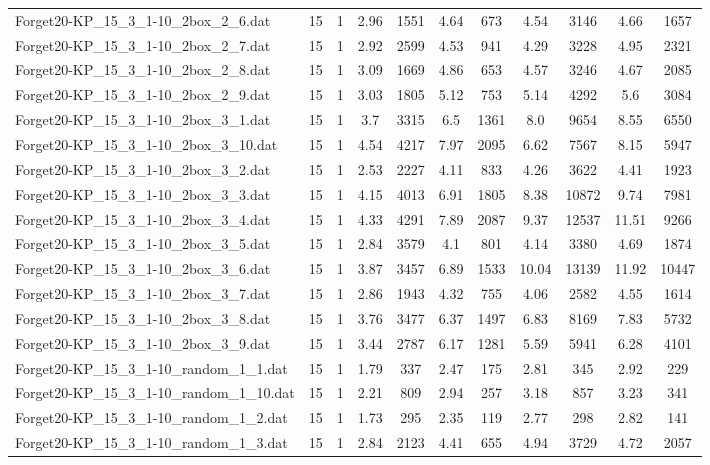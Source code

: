 \begin{table}[!ht]
\begin{tabular}{lcccccccccc}
Forget20-KP\_15\_3\_1-10\_2box\_2\_6.dat & 15 & 1 & 2.96 & 1551 & 4.64 & 673 & 4.54 & 3146 & 4.66 & 1657 \\
Forget20-KP\_15\_3\_1-10\_2box\_2\_7.dat & 15 & 1 & 2.92 & 2599 & 4.53 & 941 & 4.29 & 3228 & 4.95 & 2321 \\
Forget20-KP\_15\_3\_1-10\_2box\_2\_8.dat & 15 & 1 & 3.09 & 1669 & 4.86 & 653 & 4.57 & 3246 & 4.67 & 2085 \\
Forget20-KP\_15\_3\_1-10\_2box\_2\_9.dat & 15 & 1 & 3.03 & 1805 & 5.12 & 753 & 5.14 & 4292 & 5.6 & 3084 \\
Forget20-KP\_15\_3\_1-10\_2box\_3\_1.dat & 15 & 1 & 3.7 & 3315 & 6.5 & 1361 & 8.0 & 9654 & 8.55 & 6550 \\
Forget20-KP\_15\_3\_1-10\_2box\_3\_10.dat & 15 & 1 & 4.54 & 4217 & 7.97 & 2095 & 6.62 & 7567 & 8.15 & 5947 \\
Forget20-KP\_15\_3\_1-10\_2box\_3\_2.dat & 15 & 1 & 2.53 & 2227 & 4.11 & 833 & 4.26 & 3622 & 4.41 & 1923 \\
Forget20-KP\_15\_3\_1-10\_2box\_3\_3.dat & 15 & 1 & 4.15 & 4013 & 6.91 & 1805 & 8.38 & 10872 & 9.74 & 7981 \\
Forget20-KP\_15\_3\_1-10\_2box\_3\_4.dat & 15 & 1 & 4.33 & 4291 & 7.89 & 2087 & 9.37 & 12537 & 11.51 & 9266 \\
Forget20-KP\_15\_3\_1-10\_2box\_3\_5.dat & 15 & 1 & 2.84 & 3579 & 4.1 & 801 & 4.14 & 3380 & 4.69 & 1874 \\
Forget20-KP\_15\_3\_1-10\_2box\_3\_6.dat & 15 & 1 & 3.87 & 3457 & 6.89 & 1533 & 10.04 & 13139 & 11.92 & 10447 \\
Forget20-KP\_15\_3\_1-10\_2box\_3\_7.dat & 15 & 1 & 2.86 & 1943 & 4.32 & 755 & 4.06 & 2582 & 4.55 & 1614 \\
Forget20-KP\_15\_3\_1-10\_2box\_3\_8.dat & 15 & 1 & 3.76 & 3477 & 6.37 & 1497 & 6.83 & 8169 & 7.83 & 5732 \\
Forget20-KP\_15\_3\_1-10\_2box\_3\_9.dat & 15 & 1 & 3.44 & 2787 & 6.17 & 1281 & 5.59 & 5941 & 6.28 & 4101 \\
Forget20-KP\_15\_3\_1-10\_random\_1\_1.dat & 15 & 1 & 1.79 & 337 & 2.47 & 175 & 2.81 & 345 & 2.92 & 229 \\
Forget20-KP\_15\_3\_1-10\_random\_1\_10.dat & 15 & 1 & 2.21 & 809 & 2.94 & 257 & 3.18 & 857 & 3.23 & 341 \\
Forget20-KP\_15\_3\_1-10\_random\_1\_2.dat & 15 & 1 & 1.73 & 295 & 2.35 & 119 & 2.77 & 298 & 2.82 & 141 \\
Forget20-KP\_15\_3\_1-10\_random\_1\_3.dat & 15 & 1 & 2.84 & 2123 & 4.41 & 655 & 4.94 & 3729 & 4.72 & 2057 \\

\end{tabular}
\end{table}
